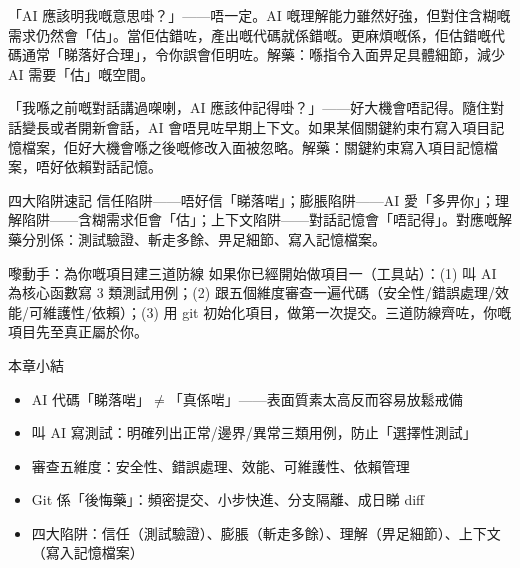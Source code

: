 
「AI 應該明我嘅意思啩？」——唔一定。AI 嘅理解能力雖然好強，但對住含糊嘅需求仍然會「估」。當佢估錯咗，產出嘅代碼就係錯嘅。更麻煩嘅係，佢估錯嘅代碼通常「睇落好合理」，令你誤會佢明咗。解藥：喺指令入面畀足具體細節，減少 AI 需要「估」嘅空間。


「我喺之前嘅對話講過㗎喇，AI 應該仲記得啩？」——好大機會唔記得。隨住對話變長或者開新會話，AI 會唔見咗早期上下文。如果某個關鍵約束冇寫入項目記憶檔案，佢好大機會喺之後嘅修改入面被忽略。解藥：關鍵約束寫入項目記憶檔案，唔好依賴對話記憶。

\begin{tcbwarn}{四大陷阱速記}
信任陷阱——唔好信「睇落啱」；膨脹陷阱——AI 愛「多畀你」；理解陷阱——含糊需求佢會「估」；上下文陷阱——對話記憶會「唔記得」。對應嘅解藥分別係：測試驗證、斬走多餘、畀足細節、寫入記憶檔案。

\end{tcbwarn}

\begin{tcbpractice}{嚟動手：為你嘅項目建三道防線}
如果你已經開始做項目一（工具站）：(1) 叫 AI 為核心函數寫 3 類測試用例；(2) 跟五個維度審查一遍代碼（安全性/錯誤處理/效能/可維護性/依賴）；(3) 用 git 初始化項目，做第一次提交。三道防線齊咗，你嘅項目先至真正屬於你。

\end{tcbpractice}

\begin{tcbsummary}{本章小結}
\begin{itemize}
  \item AI 代碼「睇落啱」$\neq$「真係啱」——表面質素太高反而容易放鬆戒備
  \item 叫 AI 寫測試：明確列出正常/邊界/異常三類用例，防止「選擇性測試」
  \item 審查五維度：安全性、錯誤處理、效能、可維護性、依賴管理
  \item Git 係「後悔藥」：頻密提交、小步快進、分支隔離、成日睇 diff
  \item 四大陷阱：信任（測試驗證）、膨脹（斬走多餘）、理解（畀足細節）、上下文（寫入記憶檔案）
\end{itemize}

\end{tcbsummary}
